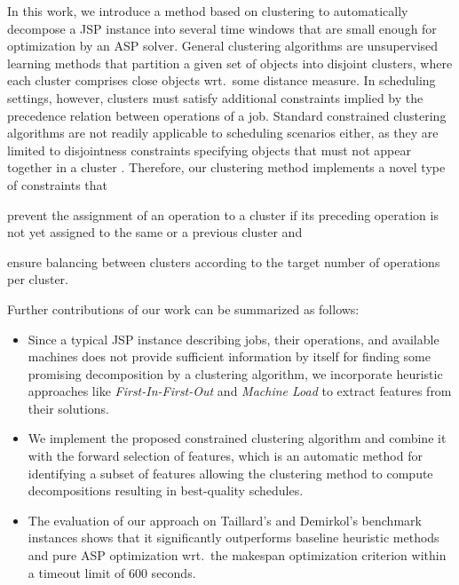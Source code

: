 \documentclass[runningheads]{llncs}
\begin{document}
In this work, we introduce a method based on clustering to automatically decompose a JSP instance into several time windows that are small enough for optimization by an ASP solver.
General clustering algorithms are unsupervised learning methods that partition a given set of objects into disjoint clusters, where each cluster comprises close objects wrt.\ some distance measure. 
In scheduling settings, however, clusters must satisfy additional constraints implied by the precedence relation between operations of a job. Standard constrained clustering algorithms are not readily applicable to scheduling scenarios either, as they are limited to disjointness constraints specifying objects that must not appear together in a cluster \cite{zhang2019framework,wagstaff2001constrained,ding2020unified}. 
Therefore, our clustering method implements a novel type of constraints that
\begin{enumerate*}[label=\emph{(\roman*)}]
  \item prevent the assignment of an operation to a cluster if its preceding operation is not yet assigned to the same or a previous cluster and
  \item ensure balancing between clusters according to the target number of operations per cluster.
\end{enumerate*}
Further contributions of our work can be summarized as follows:
\begin{itemize}
  \item Since a typical JSP instance describing jobs, their operations, and available machines does not provide sufficient information by itself for finding some promising decomposition by a clustering algorithm, we incorporate heuristic approaches like \textit{First-In-First-Out} and \textit{Machine Load} to extract features from their solutions.
  \item We implement the proposed constrained clustering algorithm and combine it with the forward selection of features, which is an automatic method for identifying a subset of features allowing the clustering method to compute decompositions resulting in best-quality schedules.
  \item The evaluation of our approach on Taillard's and Demirkol's benchmark instances \cite{taillard1993benchmarks, demirkol1998benchmarks} shows that it significantly outperforms baseline heuristic methods and pure ASP optimization wrt.\ the makespan optimization criterion within a timeout limit of 600 seconds.
\end{itemize}
\end{document}
